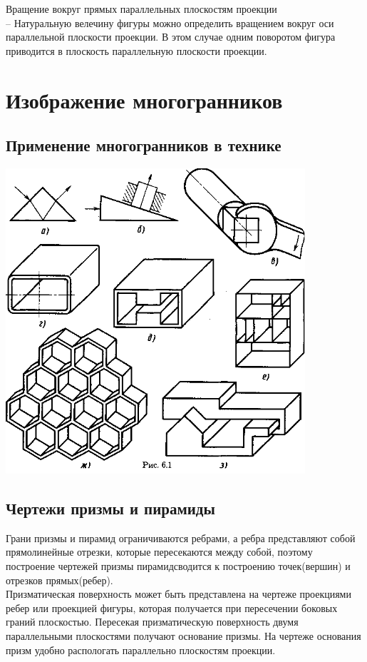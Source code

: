 \documentclass[a4paper, 12pt]{article}
\begin{document}
Вращение вокруг прямых параллельных плоскостям проекции\\
-- Натуральную велечину фигуры можно определить вращением вокруг оси параллельной плоскости проекции. В этом случае одним поворотом фигура приводится в плоскость параллельную плоскости проекции.\\

\section{Изображение многогранников}
\subsection{Применение многогранников в технике}
\includegraphics{img/611.png}\\
\subsection{Чертежи призмы и пирамиды}
Грани призмы и пирамид ограничиваются ребрами, а ребра представляют собой прямолинейные отрезки, которые пересекаются между собой, поэтому построение чертежей призмы пирамидсводится к построению точек(вершин) и отрезков прямых(ребер).\\

Призматическая поверхность может быть представлена на чертеже проекциями ребер или проекцией фигуры, которая получается при пересечении боковых граний плоскостью. Пересекая призматическую поверхность двумя параллельными плоскостями получают основание призмы. На чертеже основания призм удобно распологать параллельно плоскостям проекции.\\
\end{document}
